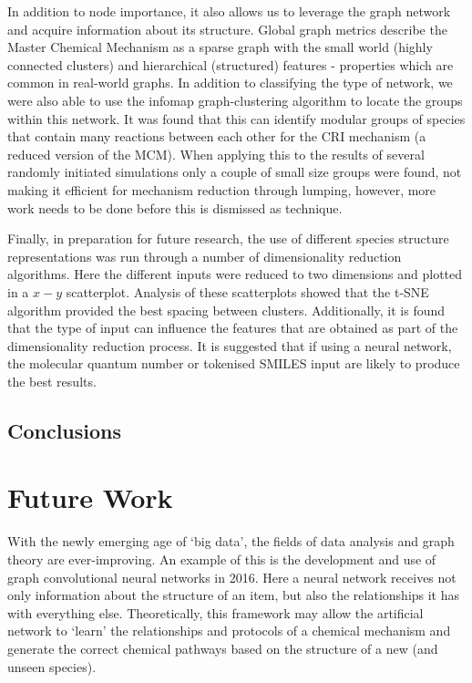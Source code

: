 In addition to node importance, it also allows us to leverage the graph network and acquire information about its structure. Global graph metrics describe the Master Chemical Mechanism as a sparse graph with the small world (highly connected clusters) and hierarchical (structured) features - properties which are common in real-world graphs. In addition to classifying the type of network, we were also able to use the infomap graph-clustering algorithm to locate the groups within this network. It was found that this can identify modular groups of species that contain many reactions between each other for the CRI mechanism (a reduced version of the MCM). When applying this to the results of several randomly initiated simulations only a couple of small size groups were found, not making it efficient for mechanism reduction through lumping, however, more work needs to be done before this is dismissed as technique.

Finally, in preparation for future research, the use of different species structure representations was run through a number of dimensionality reduction algorithms. Here the different inputs were reduced to two dimensions and plotted in a $x-y$ scatterplot. Analysis of these scatterplots showed that the t-SNE algorithm provided the best spacing between clusters. Additionally, it is found that the type of input can influence the features that are obtained as part of the dimensionality reduction process. It is suggested that if using a neural network, the molecular quantum number or tokenised SMILES input are likely to produce the best results.

\subsection{Conclusions}


\section{Future Work}\label{sec:futurework}
With the newly emerging age of `big data', the fields of data analysis and graph theory are ever-improving. An example of this is the development and use of graph convolutional neural networks in 2016. Here a neural network receives not only information about the structure of an item, but also the relationships it has with everything else. Theoretically, this framework may allow the artificial network to `learn' the relationships and protocols of a chemical mechanism and generate the correct chemical pathways based on the structure of a new (and unseen species).

